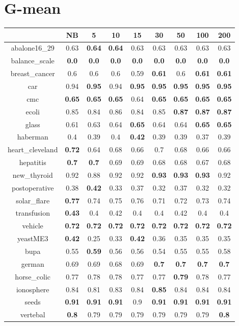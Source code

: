 \documentclass{article}%
\begin{document}
%
\section*{G{-}mean}%
\begin{tabular}{c|cccccccc}%
\hline%
&NB&5&10&15&30&50&100&200\\%
\hline%
abalone16\_29&0.63&\textbf{0.64}&\textbf{0.64}&0.63&0.63&0.63&0.63&0.63\\%
\hline%
balance\_scale&\textbf{0.0}&\textbf{0.0}&\textbf{0.0}&\textbf{0.0}&\textbf{0.0}&\textbf{0.0}&\textbf{0.0}&\textbf{0.0}\\%
\hline%
breast\_cancer&0.6&0.6&0.6&0.59&\textbf{0.61}&0.6&\textbf{0.61}&\textbf{0.61}\\%
\hline%
car&0.94&\textbf{0.95}&0.94&\textbf{0.95}&\textbf{0.95}&\textbf{0.95}&\textbf{0.95}&\textbf{0.95}\\%
\hline%
cmc&\textbf{0.65}&\textbf{0.65}&\textbf{0.65}&0.64&\textbf{0.65}&\textbf{0.65}&\textbf{0.65}&\textbf{0.65}\\%
\hline%
ecoli&0.85&0.84&0.86&0.84&0.85&\textbf{0.87}&\textbf{0.87}&\textbf{0.87}\\%
\hline%
glass&0.61&0.63&0.64&\textbf{0.65}&0.64&0.64&\textbf{0.65}&\textbf{0.65}\\%
\hline%
haberman&0.4&0.39&0.4&\textbf{0.42}&0.39&0.39&0.37&0.39\\%
\hline%
heart\_cleveland&\textbf{0.72}&0.64&0.68&0.66&0.7&0.68&0.66&0.66\\%
\hline%
hepatitis&\textbf{0.7}&\textbf{0.7}&0.69&0.69&0.68&0.68&0.67&0.68\\%
\hline%
new\_thyroid&0.92&0.88&0.92&0.92&\textbf{0.93}&\textbf{0.93}&\textbf{0.93}&0.92\\%
\hline%
postoperative&0.38&\textbf{0.42}&0.33&0.37&0.32&0.37&0.32&0.32\\%
\hline%
solar\_flare&\textbf{0.77}&0.74&0.75&0.76&0.71&0.72&0.73&0.74\\%
\hline%
transfusion&\textbf{0.43}&0.4&0.42&0.4&0.4&0.42&0.4&0.4\\%
\hline%
vehicle&\textbf{0.72}&\textbf{0.72}&\textbf{0.72}&\textbf{0.72}&\textbf{0.72}&\textbf{0.72}&\textbf{0.72}&\textbf{0.72}\\%
\hline%
yeastME3&\textbf{0.42}&0.25&0.33&\textbf{0.42}&0.36&0.35&0.35&0.35\\%
\hline%
bupa&0.55&\textbf{0.59}&0.56&0.56&0.54&0.55&0.55&0.58\\%
\hline%
german&0.69&0.69&0.68&0.69&\textbf{0.7}&\textbf{0.7}&\textbf{0.7}&\textbf{0.7}\\%
\hline%
horse\_colic&0.77&0.78&0.78&0.77&0.77&\textbf{0.79}&0.78&0.77\\%
\hline%
ionosphere&0.84&0.81&0.83&0.84&\textbf{0.85}&0.84&0.84&0.84\\%
\hline%
seeds&\textbf{0.91}&\textbf{0.91}&\textbf{0.91}&0.9&\textbf{0.91}&\textbf{0.91}&\textbf{0.91}&\textbf{0.91}\\%
\hline%
vertebal&\textbf{0.8}&0.79&0.79&0.79&0.79&0.79&0.79&\textbf{0.8}\\%
\hline%
\end{tabular}

%
\end{document}
